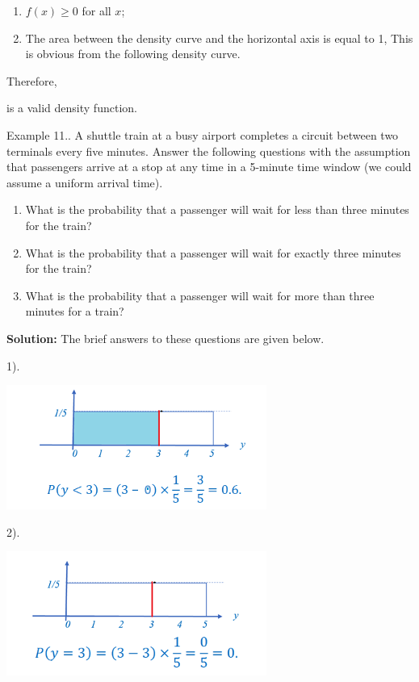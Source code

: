 \documentclass[
]{book}
\begin{document}
\begin{enumerate}
\def\labelenumi{\arabic{enumi}.}
\item
  \(f(x) \ge 0\) for all \(x\);
\item
  The area between the density curve and the horizontal axis is equal to 1, This is obvious from the following density curve.
\end{enumerate}

Therefore,

is a valid density function.

Example 11.. A shuttle train at a busy airport completes a circuit between two terminals every five minutes. Answer the following questions with the assumption that passengers arrive at a stop at any time in a 5-minute time window (we could assume a uniform arrival time).

\begin{enumerate}
\def\labelenumi{\arabic{enumi})}
\item
  What is the probability that a passenger will wait for less than three minutes for the train?
\item
  What is the probability that a passenger will wait for exactly three minutes for the train?
\item
  What is the probability that a passenger will wait for more than three minutes for a train?
\end{enumerate}

\textbf{Solution:} The brief answers to these questions are given below.

1).

\begin{center}\includegraphics[width=0.5\linewidth]{week03/uniformExample02-1} \end{center}

2).

\begin{center}\includegraphics[width=0.5\linewidth]{week03/uniformExample02-2} \end{center}
\end{document}
